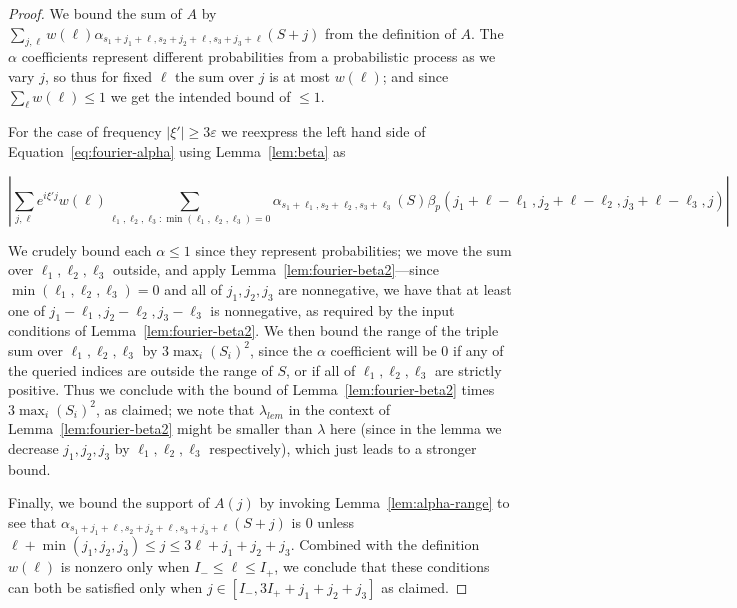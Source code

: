 \documentclass[11pt]{article}
\theoremstyle{plain}
\newcommand{\eps}{\varepsilon}
\begin{document}
\begin{proof}
We bound the sum of $A$ by $\sum_{j,\ell} w(\ell)\alpha_{s_1+j_1+\ell,s_2+j_2+\ell,s_3+j_3+\ell}(S+j)$ from the definition of $A$. The $\alpha$ coefficients represent different probabilities from a probabilistic process as we vary $j$, so thus for fixed $\ell$ the sum over $j$ is at most $w(\ell)$; and since $\sum_\ell w(\ell)\leq 1$ we get the intended bound of $\leq 1$.


For the case of frequency $|\xi'|\geq 3\eps$ we reexpress the left hand side of Equation~\ref{eq:fourier-alpha} using Lemma~\ref{lem:beta} as 



\[\left|\sum_{j,\ell} e^{i\xi' j}w(\ell)\sum_{\ell_1,\ell_2,\ell_3:\min(\ell_1,\ell_2,\ell_3)=0} \alpha_{s_1+\ell_1,s_2+\ell_2,s_3+\ell_3}(S) \beta_p(j_1+\ell-\ell_1,j_2+\ell-\ell_2,j_3+\ell-\ell_3,j)\right|\]

We crudely bound each $\alpha\leq 1$ since they represent probabilities; we move the sum over $\ell_1,\ell_2,\ell_3$ outside, and apply Lemma~\ref{lem:fourier-beta2}---since $\min(\ell_1,\ell_2,\ell_3)=0$ and all of $j_1,j_2,j_3$ are nonnegative, we have that at least one of $j_1-\ell_1,j_2-\ell_2,j_3-\ell_3$ is nonnegative, as required by the input conditions of Lemma~\ref{lem:fourier-beta2}. We then bound the range of the triple sum over $\ell_1,\ell_2,\ell_3$ by $3\max_i(S_i)^2$, since the $\alpha$ coefficient will be 0 if any of the queried indices are outside the range of $S$, or if all of $\ell_1,\ell_2,\ell_3$ are strictly positive. Thus we conclude with the bound of Lemma~\ref{lem:fourier-beta2} times $3\max_i(S_i)^2$, as claimed; we note that $\lambda_{lem}$ in the context of Lemma~\ref{lem:fourier-beta2} might be smaller than $\lambda$ here (since in the lemma we decrease $j_1,j_2,j_3$ by $\ell_1,\ell_2,\ell_3$ respectively), which just leads to a stronger bound.

Finally, we bound the support of $A(j)$ by invoking Lemma~\ref{lem:alpha-range} to see that $\alpha_{s_1+j_1+\ell,s_2+j_2+\ell,s_3+j_3+\ell}(S+j)$ is 0 unless $\ell+\min(j_1,j_2,j_3)\leq j\leq 3\ell+j_1+j_2+j_3$. Combined with the definition $w(\ell)$ is nonzero only when $I_-\leq \ell\leq I_+$, we conclude that these conditions can both be satisfied only when $j\in [I_-,3I_++j_1+j_2+j_3]$ as claimed.
\end{proof}
\end{document}
